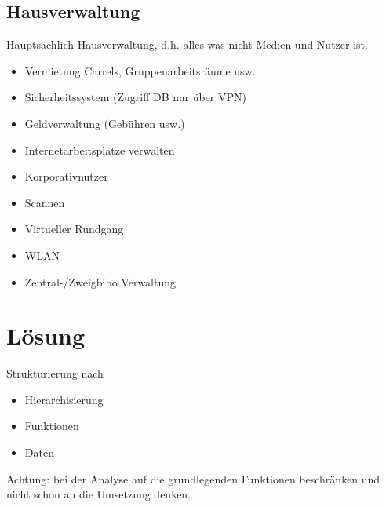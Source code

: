 \section{Hausverwaltung}
Hauptsächlich Hausverwaltung, d.h. alles was nicht Medien und Nutzer ist.
\begin{itemize}
\item Vermietung Carrels, Gruppenarbeitsräume usw.
\item Sicherheitssystem (Zugriff DB nur über VPN)
\item Geldverwaltung (Gebühren usw.)
\item Internetarbeitsplätze verwalten
\item Korporativnutzer
\item Scannen
\item Virtueller Rundgang
\item WLAN
\item Zentral-/Zweigbibo Verwaltung
\end{itemize}

\chapter{Lösung}
Strukturierung nach
\begin{itemize}
\item Hierarchisierung
\item Funktionen
\item Daten
\end{itemize}
Achtung: bei der Analyse auf die grundlegenden Funktionen beschränken und nicht schon an die Umsetzung denken.

